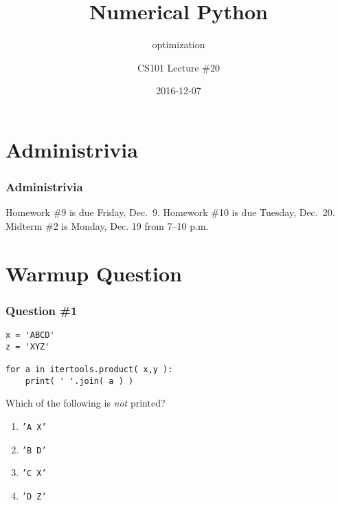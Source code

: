 \documentclass[11pt]{beamer}
\title{Numerical Python}
\subtitle{optimization}
\author{CS101 Lecture \#20}
\date{2016-12-07}
\begin{document}
  \setcounter{showProgressBar}{0}
  \setcounter{showSlideNumbers}{0}

\frame{\titlepage}

\setcounter{framenumber}{0}
\setcounter{showProgressBar}{1}
\setcounter{showSlideNumbers}{1}

\section{Administrivia}

\begin{frame}
  \frametitle{Administrivia}
  \Enlarge

  \begin{itemize}
  \myitem  Homework \#9 is due Friday, Dec.\ 9.
  \myitem  Homework \#10 is due Tuesday, Dec.\ 20.
  \myitem  Midterm \#2 is Monday, Dec. 19 from 7–10 p.m.
  \end{itemize}
\end{frame}

\section{Warmup Question}

\begin{frame}[fragile]
  \frametitle{Question \#1}

  \begin{Verbatim}
x = 'ABCD'
z = 'XYZ'

for a in itertools.product( x,y ):
    print( ' '.join( a ) )
  \end{Verbatim}

Which of the following is \emph{not} printed?

  \begin{enumerate}[label=\Alph*]
    \item  \texttt{'A X'}
    \item  \texttt{'B D'}
    \item  \texttt{'C X'}
    \item  \texttt{'D Z'}
  \end{enumerate}
\end{frame}
\end{document}
